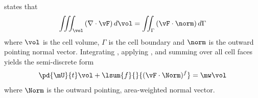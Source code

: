 states that
\begin{equation}
  \iiint_{\vol}\left( \nabla \cdot \vF \right) d \vol = 
  \iint_{\Gamma}\left( \vF \cdot \norm \right) d \Gamma
  \label{div-theorem}
\end{equation}
where $\vol$ is the cell volume, $\Gamma$ is the cell boundary and $\norm$ is
the outward pointing normal vector.  Integrating , applying
, and summing over all cell faces yields the semi-discrete
form
\begin{equation}
  \pd{\mU}{t} \vol
  + \lsum{f}{}{(\vF \cdot \Norm)^f} = \mw \vol
	\label{semi-discrete}
 \end{equation}
where $\Norm$ is the outward pointing, area-weighted normal vector.

